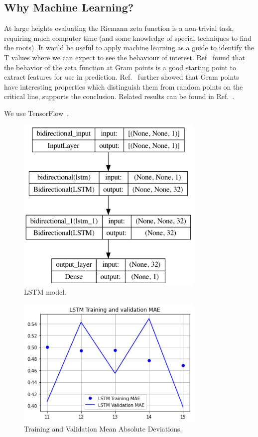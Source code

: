 \documentclass[twoside]{article}
\begin{document}
\subsection{\label{secwhy}Why Machine Learning?}

At large heights evaluating the Riemann zeta function  is a non-trivial task, requiring much computer time 
(and some knowledge of special techniques to find the roots).  It would be useful to apply
machine learning
as a guide to identify the T values where we can expect to see the behaviour of interest.
Ref~\cite{osneural} found that the behavior of the zeta function at Gram points 
is a good starting point to extract features for use in prediction. 
Ref.~\cite{Shanker 2018a} further showed that Gram points have interesting properties 
which distinguish them from random points on the critical line, supports the conclusion. 
Related  results can be found in Ref.~\cite{os6, Shanker 2018b,Shanker 2020}.

We use TensorFlow~\cite{FrancoisChollet 2021}.

\begin{figure}
\centering
\includegraphics[width=0.8\textwidth]{2.png}
\caption[]{ 
  LSTM model. 
  }
\vspace{1mm}
\label{z2}
\end{figure}

\begin{figure}
\centering
\includegraphics[width=0.8\textwidth]{3.png}
\caption[]{ 
  Training and Validation Mean Absolute Deviations.
  }
\vspace{1mm}
\label{z3}
\end{figure}
\end{document}
